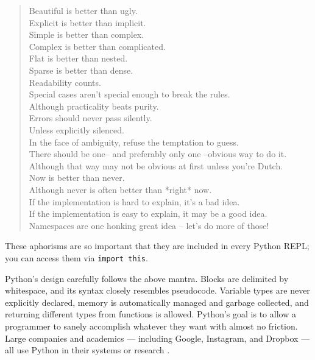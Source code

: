 \documentclass[12pt]{report}
\begin{document}
\begin{singlespace*}
\begin{quote}
    Beautiful is better than ugly. \\
    Explicit is better than implicit. \\
    Simple is better than complex. \\
    Complex is better than complicated. \\
    Flat is better than nested. \\
    Sparse is better than dense. \\
    Readability counts. \\
    Special cases aren't special enough to break the rules. \\
    Although practicality beats purity. \\
    Errors should never pass silently. \\
    Unless explicitly silenced. \\
    In the face of ambiguity, refuse the temptation to guess. \\
    There should be one-- and preferably only one --obvious way to do it. \\
    Although that way may not be obvious at first unless you're Dutch. \\
    Now is better than never. \\
    Although never is often better than *right* now. \\
    If the implementation is hard to explain, it's a bad idea. \\
    If the implementation is easy to explain, it may be a good idea. \\
    Namespaces are one honking great idea -- let's do more of those!
\end{quote}
\end{singlespace*}
These aphorisms are so important that they are included in every Python REPL; you can access them via \texttt{import this}.

Python's design carefully follows the above mantra. Blocks are delimited by whitespace, and its syntax closely resembles pseudocode. Variable types are never explicitly declared, memory is automatically managed and garbage collected, and returning different types from functions is allowed. Python's goal is to allow a programmer to sanely accomplish whatever they want with almost no friction. Large companies and academics --- including Google, Instagram, and Dropbox --- all use Python in their systems or research \cite{python-quotes}.
\end{document}
